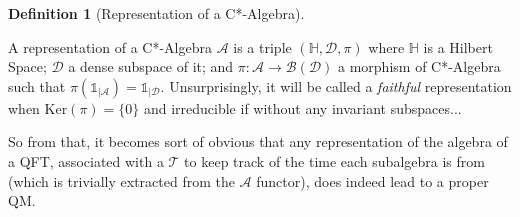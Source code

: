 \documentclass[a4paper,11pt]{article}
\numberwithin{equation}{section}
\theoremstyle{definition}
\newtheorem{definition}{Definition}
\newtheorem{comment}{Comment}
\begin{document}
\begin{definition}[Representation of a C*-Algebra]$\quad$

    A representation of a C*-Algebra $\mathcal{A}$ is a triple $(\mathbb{H},\mathcal{D},\pi)$ where $\mathbb{H}$ is a Hilbert Space; $\mathcal{D}$ a dense subspace of it; and $\pi : \mathcal{A}\to\mathcal{B}(\mathcal{D})$ a morphism of C*-Algebra such that $\pi(\mathds{1}_{|\mathcal{A}})=\mathds{1}_{|\mathcal{D}}$.
    Unsurprisingly, it will be called a \emph{faithful} representation when $\mathrm{Ker}(\pi)=\{0\}$ and irreducible if without any invariant subspaces...
    
    So from that, it becomes sort of obvious that any representation of the algebra of a QFT, associated with a $\mathcal{T}$ to keep track of the time each subalgebra is from (which is trivially extracted from the $\mathcal{A}$ functor), does indeed lead to a proper QM.
\end{definition}

\end{document}
